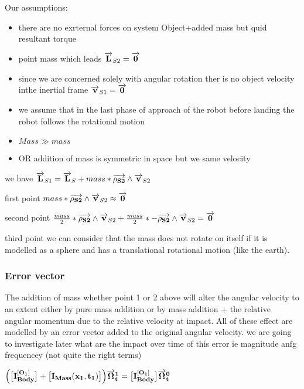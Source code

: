 Our assumptions:
\begin{itemize}
	\item there are no exrternal forces on system Object+added mass but quid resultant torque
	\item point mass which leads $\overrightarrow{\bf L}_{S2}=\overrightarrow{\bf 0}$
	\item since we are concerned solely with angular rotation ther is no object velocity inthe inertial frame $\overrightarrow{\bf v}_{S1}=\overrightarrow{\bf 0}$
	\item we assume that in the last phase of approach of the robot before landing the robot follows the rotational motion
\end{itemize} 
\begin{itemize}
	\item $Mass \gg mass$
	\item OR addition of mass is symmetric in space but we same velocity
\end{itemize}

we have $\overrightarrow{\bf L}_{S1}=\overrightarrow{\bf L}_{S}+mass*\overrightarrow{\bf \rho_{S2}}\wedge\overrightarrow{\bf v}_{S2}$

first point $mass*\overrightarrow{\bf \rho_{S2}}\wedge\overrightarrow{\bf v}_{S2} \approx \overrightarrow{\bf 0}$

second point $\frac{mass}{2}*\overrightarrow{\bf \rho_{S2}}\wedge\overrightarrow{\bf v}_{S2}+\frac{mass}{2}*-\overrightarrow{\bf \rho_{S2}}\wedge\overrightarrow{\bf v}_{S2} = \overrightarrow{\bf 0}$

third point we can consider that the mass does not rotate on itself if it is modelled as a sphere and has a translational rotational motion (like the earth).


\subsubsection{Error vector}
The addition of mass whether point 1 or 2 above will alter the angular velocity to an extent either by pure mass addition or by mass addition + the relative angular momentum due to the relative velocity at impact. All of these effect are modelled by an error vector added to the original angular velocity. we are going to investigate later what are the impact over time of this error ie magnitude anfg frequencey (not quite the right terms)

$ \Big(\big[\bf I^{[O_1]}_{Body}\big] +\big [I_{Mass}(x_1,t_1)\big]\Big) \overrightarrow{\bf \Omega}^{1}_{t}= \big[\bf I^{[O_1]}_{Body}\big]\overrightarrow{\bf \Omega}^{0}_{t}$


